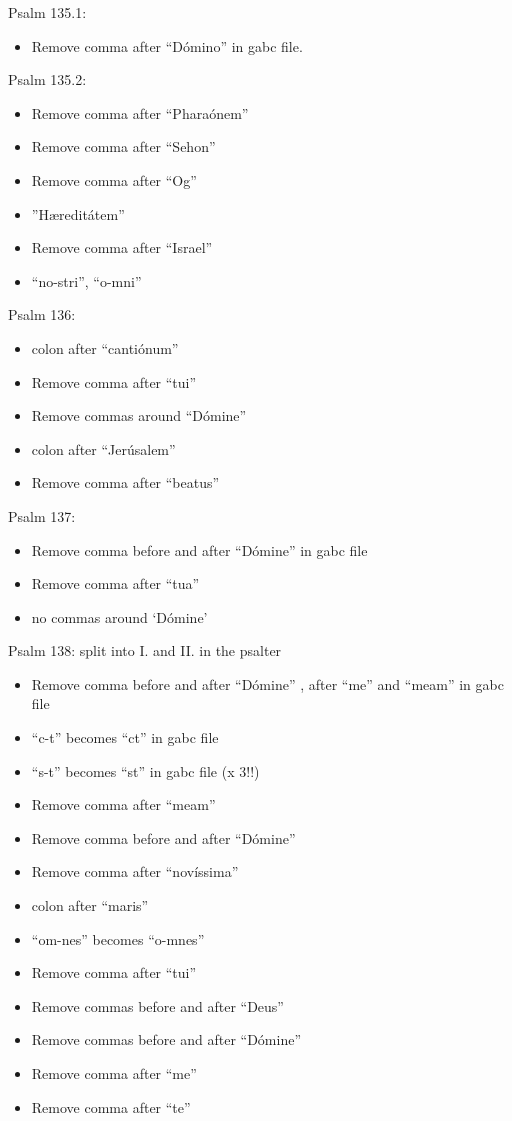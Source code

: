 \documentclass[11pt]{article}
\begin{document}
Psalm 135.1:
  \begin{itemize}
  \item Remove comma after ``Dómino'' in gabc file.
    \end{itemize}

Psalm 135.2:
  \begin{itemize}
  \item Remove comma after ``Pharaónem''
  \item  Remove comma after ``Sehon''
   \item Remove comma after ``Og''
   \item ''Hæreditátem''
     \item Remove comma after ``Israel''
     \item
     ``no-stri'', ``o-mni''
    \end{itemize}

Psalm 136:
  \begin{itemize}
  \item colon after ``cantiónum''
    \item  Remove comma after ``tui''
    \item
    Remove commas around ``Dómine''
  \item  colon after ``Jerúsalem''
  \item
  Remove comma after ``beatus''
    \end{itemize}

      Psalm 137:
  \begin{itemize}
  \item Remove comma before and after ``Dómine'' in gabc file
  \item  Remove comma after ``tua''
  \item
  no commas around `Dómine'
    \end{itemize}

      Psalm 138: split into I. and II. in the psalter
  \begin{itemize}
    \item Remove comma before and after ``Dómine'' , after ``me'' and ``meam'' in gabc file
    \item
    ``c-t'' becomes ``ct'' in gabc file
       \item
    ``s-t'' becomes ``st'' in gabc file (x 3!!)
    \item
    Remove comma after ``meam''
  \item Remove comma before and after ``Dómine'' 
  \item  Remove comma after ``novíssima''
  \item
  colon after ``maris''
  \item
   ``om-nes'' becomes  ``o-mnes''
  \item Remove comma after ``tui''
  \item
  
  Remove commas before and after ``Deus''
  \item   Remove commas before and after ``Dómine''
  \item Remove comma after ``me''
   \item Remove comma after ``te''
  
    \end{itemize}
\end{document}
